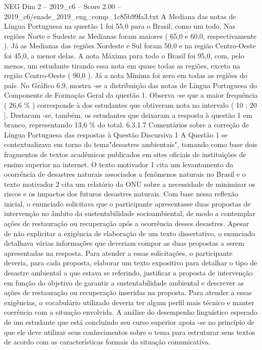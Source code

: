 \begin{textsample}{NEG Dim 2 – 2019\_c6 – Score 2.00 – 2019\_c6/enade\_2019\_eng\_comp\_1c85b99fa3.txt}
A Mediana das notas de Língua Portuguesa na questão 1 foi 55,0 para o Brasil, como um todo.
Nas regiões Norte e Sudeste as Medianas foram maiores ( 65,0 e 60,0, respectivamente ).
Já as Medianas das regiões Nordeste e Sul foram 50,0 e na região Centro-Oeste foi 45,0, a menor delas.
A nota Máxima para todo o Brasil foi 95,0, com, pelo menos, um estudante tirando essa nota em quase todas as regiões, exceto na região Centro-Oeste ( 90,0 ).
Já a nota Mínima foi zero em todas as regiões do país.
No Gráfico 6.9, mostra -se a distribuição das notas de Língua Portuguesa do Componente de Formação Geral da questão 1.
Observa -se que a maior frequência ( 26,6 \% ) corresponde à dos estudantes que obtiveram nota no intervalo ( 10 ; 20 ].
Destacam -se, também, os estudantes que deixaram a resposta à questão 1 em branco, representando 13,6 \% do total. 6.3.1.7 Comentários sobre a correção de Língua Portuguesa das respostas à Questão Discursiva 1 A Questão 1 se contextualizava em torno do tema"desastres ambientais", tomando como base dois fragmentos de textos acadêmicos publicados em sites oficiais de instituições de ensino superior na internet.
O texto motivador 1 cita um levantamento da ocorrência de desastres naturais associados a fenômenos naturais no Brasil e o texto motivador 2 cita um relatório da ONU sobre a necessidade de minimizar os riscos e os impactos dos futuros desastres naturais.
Com base nessa reflexão inicial, o enunciado solicitava que o participante apresentasse duas propostas de intervenção no âmbito da sustentabilidade socioambiental, de modo a contemplar ações de restauração ou recuperação após a ocorrência desses desastres.
Apesar de não explicitar a exigência de elaboração de um texto dissertativo, o enunciado detalhava várias informações que deveriam compor as duas propostas a serem apresentadas na resposta.
Para atender a essas solicitações, o participante deveria, para cada proposta, elaborar um texto expositivo para detalhar o tipo de desastre ambiental a que estava se referindo, justificar a proposta de intervenção em função do objetivo de garantir a sustentabilidade ambiental e descrever as ações de restauração ou recuperação inseridas na proposta.
Para atender a essas exigências, o vocabulário utilizado deveria ter algum perfil mais técnico e manter coerência com a situação envolvida.
A análise do desempenho linguístico esperado de um estudante que está concluindo seu curso superior apoia -se no princípio de que ele deve utilizar seus conhecimentos sobre o tema para estruturar seus textos de acordo com as características formais da situação comunicativa.

\end{textsample}
